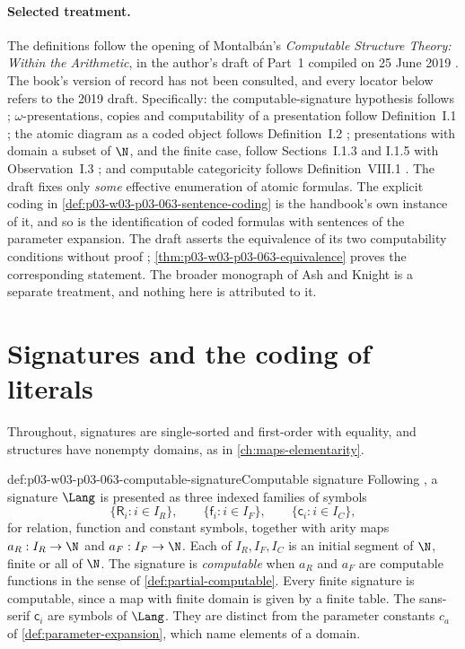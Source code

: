 \paragraph{Selected treatment.}
The definitions follow the opening of Montalb\'an's \emph{Computable Structure
Theory: Within the Arithmetic}, in the author's draft of Part~1 compiled on
25 June 2019 \cite{Montalban2019CSTDraft}.  The book's version of record
\cite{Montalban2021CST} has not been consulted, and every locator below refers
to the 2019 draft.  Specifically: the computable-signature hypothesis follows
\cite[p.~xviii]{Montalban2019CSTDraft}; \(\omega\)-presentations, copies and
computability of a presentation follow Definition~I.1
\cite[pp.~1--2]{Montalban2019CSTDraft}; the atomic diagram as a coded object
follows Definition~I.2 \cite[p.~2]{Montalban2019CSTDraft}; presentations with
domain a subset of \(\N\), and the finite case, follow Sections~I.1.3 and
I.1.5 with Observation~I.3 \cite[pp.~3--5]{Montalban2019CSTDraft}; and
computable categoricity follows Definition~VIII.1
\cite[p.~123]{Montalban2019CSTDraft}.  The draft fixes only \emph{some}
effective enumeration of atomic formulas.  The explicit coding in
\cref{def:p03-w03-p03-063-sentence-coding} is the handbook's own instance of
it, and so is the identification of coded formulas with sentences of the
parameter expansion.  The draft asserts the equivalence of its two
computability conditions without proof \cite[p.~2]{Montalban2019CSTDraft};
\cref{thm:p03-w03-p03-063-equivalence} proves the corresponding statement.
The broader monograph of Ash and Knight \cite{AshKnight2000} is a separate
treatment, and nothing here is attributed to it.

\section{Signatures and the coding of literals}
\label{sec:p03-w03-p03-063-coding}

Throughout, signatures are single-sorted and first-order with equality, and
structures have nonempty domains, as in \cref{ch:maps-elementarity}.

\begin{hbconvention}{def:p03-w03-p03-063-computable-signature}{Computable signature}
Following \cite[p.~xviii]{Montalban2019CSTDraft}, a signature \(\Lang\) is
presented as three indexed families of symbols
\[
 \{\mathsf R_i:i\in I_R\},\qquad
 \{\mathsf f_i:i\in I_F\},\qquad
 \{\mathsf c_i:i\in I_C\},
\]
for relation, function and constant symbols, together with arity maps
\(a_R:I_R\to\N\) and \(a_F:I_F\to\N\).  Each of \(I_R,I_F,I_C\) is an
initial segment of \(\N\), finite or all of \(\N\).  The signature is
\emph{computable} when \(a_R\) and \(a_F\) are computable functions in the
sense of \cref{def:partial-computable}.  Every finite signature is
computable, since a map with finite domain is given by a finite table.  The
sans-serif \(\mathsf c_i\) are symbols of \(\Lang\).  They are distinct from
the parameter constants \(c_a\) of \cref{def:parameter-expansion}, which
name elements of a domain.
\end{hbconvention}


